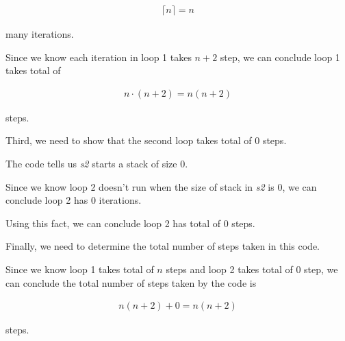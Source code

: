 \documentclass[12pt]{article}
\begin{document}
\begin{enumerate}[a.]
    \begin{align}
        \lceil n \rceil = n
    \end{align}

    many iterations.

    \bigskip

    Since we know each iteration in loop 1 takes $n+2$ step, we can conclude
    loop 1 takes total of

    \begin{align}
        n \cdot (n+2) = n(n+2)
    \end{align}

    steps.

    \bigskip

    Third, we need to show that the second loop takes total of 0 steps.

    \bigskip

    The code tells us \textit{s2} starts a stack of size 0.

    \bigskip

    Since we know loop 2 doesn't run when the size of stack in \textit{s2} is 0,
    we can conclude loop 2 has 0 iterations.

    \bigskip

    Using this fact, we can conclude loop 2 has total of 0 steps.

    \bigskip

    Finally, we need to determine the total number of steps taken in this code.

    \bigskip

    Since we know loop 1 takes total of $n$ steps and loop 2 takes total of 0 step, we can
    conclude the total number of steps taken by the code is

    \begin{align}
        n(n+2) + 0 = n(n+2)
    \end{align}

    steps.

    \bigskip







\end{enumerate}
\end{document}
